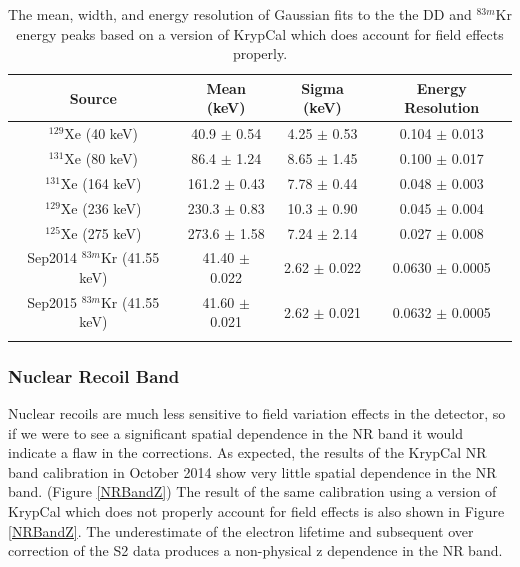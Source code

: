 \begin{longtable}{|  c | c | c | c |} 
\hline
Source & Mean (keV) & Sigma (keV) & Energy Resolution \\ \hline \hline
$^{129}$Xe (40 keV) & 40.9 $\pm$ 0.54  & 4.25 $\pm$ 0.53 & 0.104 $\pm$ 0.013 \\ \hline

$^{131}$Xe (80 keV) & 86.4  $\pm$ 1.24  & 8.65  $\pm$ 1.45 & 0.100  $\pm$ 0.017 \\ \hline

$^{131}$Xe (164 keV) & 161.2  $\pm$ 0.43  & 7.78  $\pm$ 0.44 & 0.048  $\pm$ 0.003  \\ \hline
 
$^{129}$Xe (236 keV) & 230.3  $\pm$ 0.83 & 10.3  $\pm$ 0.90  & 0.045  $\pm$ 0.004  \\ \hline

$^{125}$Xe (275 keV) & 273.6 $\pm$ 1.58 & 7.24   $\pm$ 2.14 & 0.027   $\pm$ 0.008  \\ \hline
 
Sep2014 $^{83m}$Kr (41.55 keV) & 41.40   $\pm$ 0.022 & 2.62 $\pm$ 0.022 & 0.0630  $\pm$ 0.0005  \\ \hline
  
Sep2015 $^{83m}$Kr (41.55 keV) & 41.60   $\pm$ 0.021 & 2.62  $\pm$ 0.021  & 0.0632  $\pm$ 0.0005  \\ \hline

\caption{The mean, width, and energy resolution of Gaussian fits to the the DD and $^{83m}$Kr energy peaks based on a version of KrypCal which does account for field effects properly.}
\label{EnergyRes2}
\end{longtable}


\subsubsection{Nuclear Recoil Band}

Nuclear recoils are much less sensitive to field variation effects in the detector, so if we were to see a significant spatial dependence in the NR band it would indicate a flaw in the corrections. As expected, the results of the KrypCal NR band calibration in October 2014 show very little spatial dependence in the NR band. (Figure \ref{NRBandZ})  The result of the same calibration using a version of KrypCal which does not properly account for field effects is also shown in Figure \ref{NRBandZ}.  The underestimate of the electron lifetime and subsequent over correction of the S2 data produces a non-physical z dependence in the NR band.

